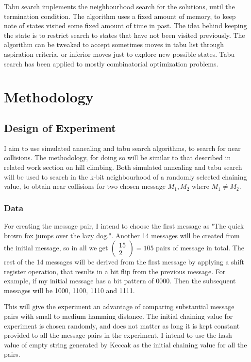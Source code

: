\documentclass[12pt]{artikel3}                  %
\begin{document}
Tabu search implements the neighbourhood search for the solutions, until the termination condition. The algorithm
uses a fixed amount of memory, to keep note of states visited some fixed amount of time in past. The idea behind
keeping the state is to restrict search to states that have not been visited previously. The algorithm can be
tweaked to accept sometimes moves in tabu list through aspiration criteria, or inferior moves just to explore
new possible states. Tabu search has been applied to mostly combinatorial optimization problems\cite{ 00034, 00035 }.

\section{Methodology}

\subsection{Design of Experiment}
I aim to use simulated annealing and tabu search algorithms, to search for near collisions. The methodology, for doing
so will be similar to that described in related work section on hill climbing. Both simulated annealing and tabu
search will be used to search in the k-bit neighbourhood of a randomly selected chaining value, to obtain near collisions
for two chosen message $M_{1},M_{2}$ where $M_{1} \neq M_{2}$.

  \subsubsection{Data}
  
  For creating the message pair, I intend to choose the first message as "The quick brown fox jumps over the lazy dog.".
  Another 14 messages will be created from the initial message, so in all we get $\begin{pmatrix} 15 \\ 2 \end{pmatrix}
  = 105$ pairs of message in total. The rest of the 14 messages will be derived from the first message by applying a
  shift register operation, that results in a bit flip from the previous message. For example, if my initial message has
  a bit pattern of 0000. Then the subsequent messages will be 1000, 1100, 1110 and 1111.
  
  This will give the experiment an advantage of comparing substantial message pairs with small to medium hamming distance.
  The initial chaining value for experiment is chosen randomly, and does not matter as long it is kept constant provided
  to all the message pairs in the experiment. I intend to use the hash value of empty string generated by Keccak as the 
  initial chaining value for all the pairs.
\end{document}
